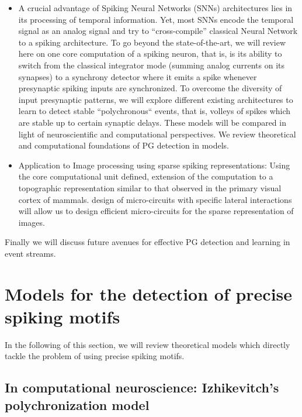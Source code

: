 \documentclass[brainsci, %
               review,submit,pdftex,moreauthors%
               ]{Definitions/mdpi}
\begin{document}
\begin{itemize}
\item
  A crucial advantage of Spiking Neural Networks (SNNs) architectures lies in its processing of temporal information. Yet, most SNNs encode the temporal signal as an analog signal and try to ``cross-compile'' classical Neural Network to a spiking architecture. To go beyond the state-of-the-art, we will review here on one core computation of a spiking neuron, that is, is its ability to switch from the classical integrator mode (summing analog currents on its synapses) to a synchrony detector where it emits a spike whenever presynaptic spiking inputs are synchronized. To overcome the diversity of input presynaptic patterns, we will explore different existing architectures to learn to detect stable ``polychronous`` events, that is, volleys of spikes which are stable up to certain synaptic delays. These models will be compared in light of neuroscientific and computational perspectives. We review theoretical and computational foundations of PG detection in models.
\item
  Application to Image processing using sparse spiking representations: Using the core computational unit defined, extension of the computation to a topographic representation similar to that observed in the primary visual cortex of mammals. design of micro-circuits with specific lateral interactions will allow us to design efficient micro-circuits for the sparse representation of images.
\end{itemize}

Finally we will discuss future avenues for effective PG detection and learning in event streams.


\section{Models for the detection of precise spiking motifs}\label{sec:detection}
In the following of this section, we will review theoretical models which directly tackle the problem of using precise spiking motifs.
\subsection{In computational neuroscience: Izhikevitch's polychronization model}
\end{document}
